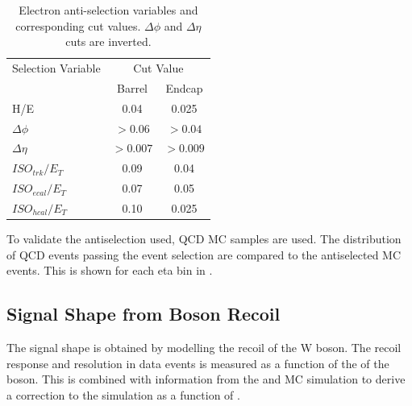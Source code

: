 \begin{table}[htbp]
  \begin{center}
    \leavevmode
    \begin{tabular}{lcc} 
    \toprule
      Selection Variable & \multicolumn{2}{c}{Cut Value}\\
                         & Barrel & Endcap\\
    \midrule
        H/E & 0.04 & 0.025 \\
        $\Delta\phi$ & $>0.06$  & $>0.04$ \\
        $\Delta\eta$ & $>0.007$ & $>0.009$\\
        $ISO_{trk} / E_T $ & 0.09 & 0.04 \\
        $ISO_{ecal}/ E_T$  & 0.07 & 0.05 \\
        $ISO_{hcal}/ E_T$  & 0.10 & 0.025\\ 
    \bottomrule
    \end{tabular}
    \caption{\label{tab:antisel}Electron anti-selection variables and corresponding cut values. $\Delta\phi$ and $\Delta\eta$ cuts are inverted.}
  \end{center}
\end{table}

To validate the antiselection used, \ac{QCD} \ac{MC} samples are used. The
distribution of \ac{QCD} events passing the event selection are compared to the
antiselected MC events. This is shown for each eta bin in
.

\subsection{Signal \ETm Shape from Boson Recoil}
\label{sec:recoil}
The signal \ETm shape is obtained by modelling the recoil of the W boson. 
The recoil response and resolution in \HepProcess{\PZ\to\Plepton\Plepton} data
events is measured as a function of the \pT of the boson. This is combined with
information from the \PW and \PZ \ac{MC} simulation to derive a correction to
the simulation \ETm as a function of \PW \pT.

